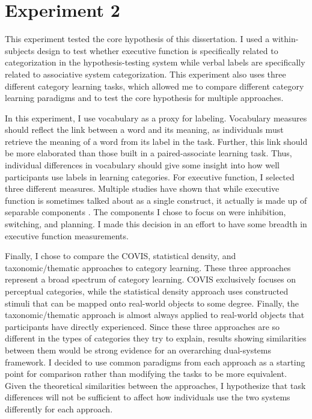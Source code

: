 \documentclass[../dissertation.tex]{subfiles}
\begin{document}
\section{Experiment 2}

	This experiment tested the core hypothesis of this dissertation. I used a within-subjects design to test whether executive function is specifically related to categorization in the hypothesis-testing system while verbal labels are specifically related to associative system categorization. This experiment also uses three different category learning tasks, which allowed me to compare different category learning paradigms and to test the core hypothesis for multiple approaches. \par
	In this experiment, I use vocabulary as a proxy for labeling. Vocabulary measures should reflect the link between a word and its meaning, as individuals must retrieve the meaning of a word from its label in the task. Further, this link should be more elaborated than those built in a paired-associate learning task. Thus, individual differences in vocabulary should give some insight into how well participants use labels in learning categories. For executive function, I selected three different measures. Multiple studies have shown that while executive function is sometimes talked about as a single construct, it actually is made up of separable components \citep{Miyake2000, Karr2018}. The components I chose to focus on were inhibition, switching, and planning. I made this decision in an effort to have some breadth in executive function measurements. \par
	Finally, I chose to compare the COVIS, statistical density, and taxonomic/thematic approaches to category learning. These three approaches represent a broad spectrum of category learning. COVIS exclusively focuses on perceptual categories, while the statistical density approach uses constructed stimuli that can be mapped onto real-world objects to some degree. Finally, the taxonomic/thematic approach is almost always applied to real-world objects that participants have directly experienced. Since these three approaches are so different in the types of categories they try to explain, results showing similarities between them would be strong evidence for an overarching dual-systems framework. I decided to use common paradigms from each approach as a starting point for comparison rather than modifying the tasks to be more equivalent. Given the theoretical similarities between the approaches, I hypothesize that task differences will not be sufficient to affect how individuals use the two systems differently for each approach.
\end{document}
